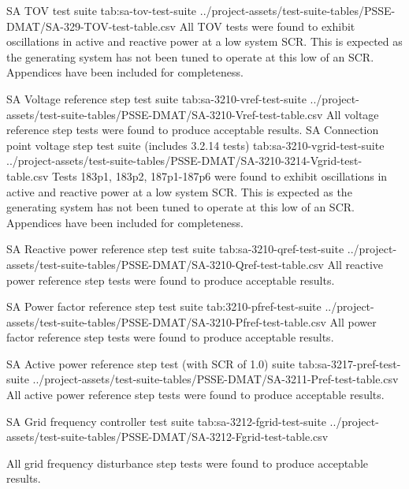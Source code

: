 \documentclass{../grid-link-report}
\newcommand{\projectassetsdir}{../project-assets}
\begin{document}
	{
		\fontsize{6}{8}\selectfont
		\autoscaledlongtable
		{SA TOV test suite}
		{tab:sa-tov-test-suite}
		{\projectassetsdir/test-suite-tables/PSSE-DMAT/SA-329-TOV-test-table.csv}
	}
		All TOV tests were found to exhibit oscillations in active and reactive power at a low system SCR. This is expected as the generating system has not been tuned to operate at this low of an SCR. Appendices have been included for completeness.
	
	{
		\fontsize{7}{9}\selectfont
		\autoscaledlongtable
		{SA Voltage reference step test suite}
		{tab:sa-3210-vref-test-suite}
		{\projectassetsdir/test-suite-tables/PSSE-DMAT/SA-3210-Vref-test-table.csv}
	}
		All voltage reference step tests were found to produce acceptable results.
	{
		\fontsize{7}{9}\selectfont
		\autoscaledlongtable
		{SA Connection point voltage step test suite (includes 3.2.14 tests)}
		{tab:sa-3210-vgrid-test-suite}
		{\projectassetsdir/test-suite-tables/PSSE-DMAT/SA-3210-3214-Vgrid-test-table.csv}
	}
	Tests 183p1, 183p2, 187p1-187p6 were found to exhibit oscillations in active and reactive power at a low system SCR. This is expected as the generating system has not been tuned to operate at this low of an SCR. Appendices have been included for completeness.
	
	{
		\fontsize{7}{9}\selectfont
		\autoscaledlongtable
		{SA Reactive power reference step test suite}
		{tab:sa-3210-qref-test-suite}
		{\projectassetsdir/test-suite-tables/PSSE-DMAT/SA-3210-Qref-test-table.csv}
	}
	All reactive power reference step tests were found to produce acceptable results.
	
	{
		\fontsize{7}{9}\selectfont
		\autoscaledlongtable
		{SA Power factor reference step test suite}
		{tab:3210-pfref-test-suite}
		{\projectassetsdir/test-suite-tables/PSSE-DMAT/SA-3210-Pfref-test-table.csv}
	}
	All power factor reference step tests were found to produce acceptable results.

	{
		\fontsize{7}{9}\selectfont
		\autoscaledlongtable
		{SA Active power reference step test (with SCR of 1.0) suite}
		{tab:sa-3217-pref-test-suite}
		{\projectassetsdir/test-suite-tables/PSSE-DMAT/SA-3211-Pref-test-table.csv}
	}
	All active power reference step tests were found to produce acceptable results.
	
	{
		\fontsize{7}{9}\selectfont
		\autoscaledlongtable
		{SA Grid frequency controller test suite}
		{tab:sa-3212-fgrid-test-suite}
		{\projectassetsdir/test-suite-tables/PSSE-DMAT/SA-3212-Fgrid-test-table.csv}
	}
	
	All grid frequency disturbance step tests were found to produce acceptable results.
	
\end{document}
